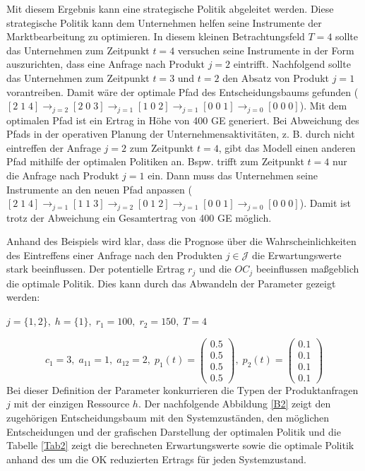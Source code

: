 Mit diesem Ergebnis kann eine strategische Politik abgeleitet werden. Diese strategische Politik kann dem Unternehmen helfen seine Instrumente der Marktbearbeitung zu optimieren. In diesem kleinen Betrachtungsfeld $T=4$ sollte das Unternehmen zum Zeitpunkt $t=4$ versuchen seine Instrumente in der Form auszurichten, dass eine Anfrage nach Produkt $j=2$ eintrifft. Nachfolgend sollte das Unternehmen zum Zeitpunkt $t=3$ und $t=2$ den Absatz von Produkt $j=1$ vorantreiben. Damit wäre der optimale Pfad des Entscheidungsbaums gefunden ($[2\;1\;4] \rightarrow_{j=2} [2\;0\;3] \rightarrow_{j=1} [1\;0\;2] \rightarrow_{j=1} [0\;0\;1]\rightarrow_{j=0} [0\;0\;0]$). Mit dem optimalen Pfad ist ein Ertrag in Höhe von 400 GE generiert. Bei Abweichung des Pfads in der operativen Planung der Unternehmensaktivitäten, z. B. durch nicht eintreffen der Anfrage $j=2$ zum Zeitpunkt $t=4$, gibt das Modell einen anderen Pfad mithilfe der optimalen Politiken an. Bspw. trifft zum Zeitpunkt $t=4$ nur die Anfrage nach Produkt $j=1$ ein. Dann muss das Unternehmen seine Instrumente an den neuen Pfad anpassen ($[2\;1\;4] \rightarrow_{j=1} [1\;1\;3] \rightarrow_{j=2} [0\;1\;2] \rightarrow_{j=1} [0\;0\;1]\rightarrow_{j=0} [0\;0\;0]$). Damit ist trotz der Abweichung ein Gesamtertrag von 400 GE möglich.

Anhand des Beispiels wird klar, dass die Prognose über die Wahrscheinlichkeiten des Eintreffens einer Anfrage nach den Produkten $j\in\mathcal{J}$ die Erwartungswerte stark beeinflussen. Der potentielle Ertrag $r_{j}$ und die $OC_{j}$ beeinflussen maßgeblich die optimale Politik. Dies kann durch das Abwandeln der Parameter gezeigt werden:
\begin{center}
$j = \{1, 2\}, \; h = \{1\}, \; r_{1} = 100, \; r_{2} = 150, \; T=4$
\end{center}
\[
    c_{1}= 3, \;
    a_11=1, \;
     a_12=2, \;
     p_{1}(t)=\begin{pmatrix} 0.5\\ 0.5\\ 0.5\\ 0.5  \end{pmatrix}, \;
     p_{2}(t)=\begin{pmatrix} 0.1\\ 0.1\\ 0.1\\ 0.1  \end{pmatrix}
  \]
Bei dieser Definition der Parameter konkurrieren die Typen der Produktanfragen $j$ mit der einzigen Ressource $h$. Der nachfolgende Abbildung \ref{B2} zeigt den zugehörigen Entscheidungsbaum mit den Systemzuständen, den möglichen Entscheidungen und der grafischen Darstellung der optimalen Politik und die Tabelle \ref{Tab2} zeigt die berechneten Erwartungswerte sowie die optimale Politik anhand des um die OK reduzierten Ertrags für jeden Systemzustand.

